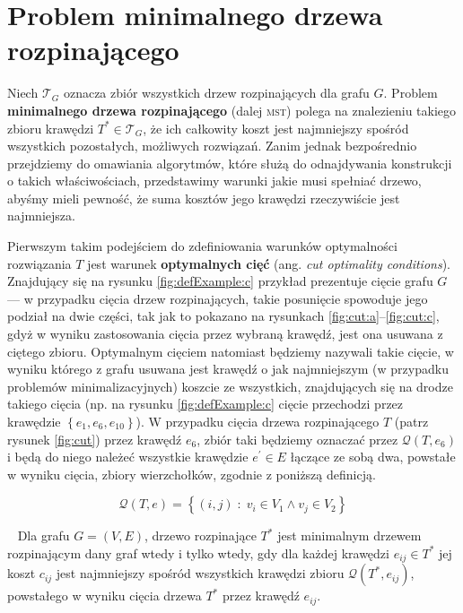 \section{Problem minimalnego drzewa rozpinającego}\label{sec:mst}

Niech $\mathcal{T}_{G}$ oznacza zbiór wszystkich drzew rozpinających dla grafu $G$. Problem \textbf{minimalnego drzewa rozpinającego} (dalej \textsc{mst}) polega na znalezieniu takiego zbioru krawędzi $T^{\ast} \in \mathcal{T}_{G}$, że ich całkowity koszt jest najmniejszy spośród wszystkich pozostałych, możliwych rozwiązań. Zanim jednak bezpośrednio przejdziemy do omawiania algorytmów, które służą do odnajdywania konstrukcji o takich właściwościach, przedstawimy warunki jakie musi spełniać drzewo, abyśmy mieli pewność, że suma kosztów jego krawędzi rzeczywiście jest najmniejsza.

Pierwszym takim podejściem do zdefiniowania warunków optymalności rozwiązania $T$ jest warunek \textbf{optymalnych cięć} (ang. \textit{cut optimality conditions}). Znajdujący się na rysunku \ref{fig:defExample:c} przykład prezentuje cięcie grafu $G$ --- w przypadku cięcia drzew rozpinających, takie posunięcie spowoduje jego podział na dwie części, tak jak to pokazano na rysunkach \ref{fig:cut:a}--\ref{fig:cut:c}, gdyż w wyniku zastosowania cięcia przez wybraną krawędź, jest ona usuwana z ciętego zbioru. Optymalnym cięciem natomiast będziemy nazywali takie cięcie, w wyniku którego z grafu usuwana jest krawędź o jak najmniejszym (w przypadku problemów minimalizacyjnych) koszcie ze wszystkich, znajdujących się na drodze takiego cięcia (np. na rysunku \ref{fig:defExample:c} cięcie przechodzi przez krawędzie $\left\{ e_{1}, e_{6}, e_{10} \right\}$). W przypadku cięcia drzewa rozpinającego $T$ (patrz rysunek \ref{fig:cut}) przez krawędź $e_{6}$, zbiór taki będziemy oznaczać przez $\mathcal{Q} \left( T, e_{6} \right)$ i będą do niego należeć wszystkie krawędzie $e^{\prime} \in E$ łączące ze sobą dwa, powstałe w wyniku cięcia, zbiory wierzchołków, zgodnie z poniższą definicją.

\begin{equation}\label{eq:treecutedgeset}
\mathcal{Q} \left( T, e \right) = \left\{ \left( i, j \right) \; : \; v_{i} \in V_{1} \wedge v_{j} \in V_{2} \right\}
\end{equation}

\begin{theorem}\label{def:optmstcut}~\cite[$516$--$518$]{Ahuja:1993:NFT:137406}
	Dla grafu $G = \left( V, E \right)$, drzewo rozpinające $T^{\ast}$ jest minimalnym drzewem rozpinającym dany graf wtedy i tylko wtedy, gdy dla każdej krawędzi $e_{ij} \in T^{\ast}$ jej koszt $c_{ij}$ jest najmniejszy spośród wszystkich krawędzi zbioru $\mathcal{Q} \left( T^{\ast}, e_{ij} \right)$, powstałego w wyniku cięcia drzewa $T^{\ast}$ przez krawędź $e_{ij}$.
\end{theorem}

